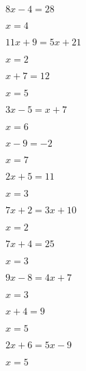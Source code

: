 \documentclass{ximera}
\begin{document}
\begin{exercise}
\begin{xmmulticols}
    \begin{question} \( 8x - 4  = 28       \) \begin{oplossing} \( x = 4   \) \end{oplossing} \end{question}
    \begin{question} \( 11x + 9 = 5x + 21  \) \begin{oplossing} \( x = 2   \) \end{oplossing} \end{question}
    \begin{question} \( x + 7   = 12       \) \begin{oplossing} \( x = 5   \) \end{oplossing} \end{question}
    \begin{question} \( 3x - 5  = x + 7    \) \begin{oplossing} \( x = 6   \) \end{oplossing} \end{question}
    \begin{question} \( x - 9   = -2       \) \begin{oplossing} \( x = 7   \) \end{oplossing} \end{question}
    \begin{question} \( 2x + 5  = 11       \) \begin{oplossing} \( x = 3   \) \end{oplossing} \end{question}
    \begin{question} \( 7x + 2  = 3x + 10  \) \begin{oplossing} \( x  = 2  \) \end{oplossing} \end{question} 
    \begin{question} \( 7x + 4  = 25       \) \begin{oplossing} \( x  = 3  \) \end{oplossing} \end{question}
    \begin{question} \( 9x - 8  = 4x + 7   \) \begin{oplossing} \( x  = 3  \) \end{oplossing} \end{question} 
    \begin{question} \( x + 4   = 9        \) \begin{oplossing} \( x  = 5  \) \end{oplossing} \end{question}
    \begin{question} \( 2x + 6  = 5x - 9   \) \begin{oplossing} \( x  = 5  \) \end{oplossing} \end{question} 
    
  \end{xmmulticols}
\end{exercise}  
    
\end{document}
